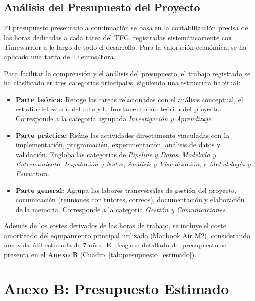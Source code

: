 \subsection*{Análisis del Presupuesto del Proyecto}

El presupuesto presentado a continuación se basa en la contabilización precisa de las horas dedicadas a cada tarea del TFG, registradas sistemáticamente con Timewarrior a lo largo de todo el desarrollo. Para la valoración económica, se ha aplicado una tarifa de 10 euros/hora.

Para facilitar la comprensión y el análisis del presupuesto, el trabajo registrado se ha clasificado en tres categorías principales, siguiendo una estructura habitual:
\begin{itemize}
    \item \textbf{Parte teórica:} Recoge las tareas relacionadas con el análisis conceptual, el estudio del estado del arte y la fundamentación teórica del proyecto. Corresponde a la categoría agrupada \textit{Investigación y Aprendizaje}.
    \item \textbf{Parte práctica:} Reúne las actividades directamente vinculadas con la implementación, programación, experimentación, análisis de datos y validación. Engloba las categorías de \textit{Pipeline y Datos}, \textit{Modelado y Entrenamiento}, \textit{Imputación y Nulos}, \textit{Análisis y Visualización}, y \textit{Metodología y Estructura}.
    \item \textbf{Parte general:} Agrupa las labores transversales de gestión del proyecto, comunicación (reuniones con tutores, correos), documentación y elaboración de la memoria. Corresponde a la categoría \textit{Gestión y Comunicaciones}.
\end{itemize}
Además de los costes derivados de las horas de trabajo, se incluye el coste amortizado del equipamiento principal utilizado (Macbook Air M2), considerando una vida útil estimada de 7 años. El desglose detallado del presupuesto se presenta en el \textbf{Anexo B} (Cuadro~\ref{tab:presupuesto_estimado}).

\newpage

\section*{Anexo B: Presupuesto Estimado}

